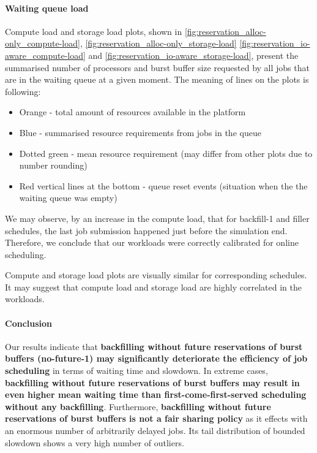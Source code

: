 \documentclass[thesis-en.tex]{subfiles}
\begin{document}
\paragraph{Waiting queue load}
Compute load and storage load plots, shown in \autoref{fig:reservation_alloc-only_compute-load}, \autoref{fig:reservation_alloc-only_storage-load} \autoref{fig:reservation_io-aware_compute-load} and \autoref{fig:reservation_io-aware_storage-load}, present the summarised number of processors and burst buffer size requested by all jobs that are in the waiting queue at a given moment. The meaning of lines on the plots is following:
\begin{itemize}
    \item Orange - total amount of resources available in the platform
    \item Blue - summarised resource requirements from jobs in the queue
    \item Dotted green - mean resource requirement (may differ from other plots due to number rounding)
    \item Red vertical lines at the bottom - queue reset events (situation when the the waiting queue was empty)
\end{itemize}

We may observe, by an increase in the compute load, that for backfill-1 and filler schedules, the last job submission happened just before the simulation end. Therefore, we conclude that our workloads were correctly calibrated for online scheduling.

Compute and storage load plots are visually similar for corresponding schedules. It may suggest that compute load and storage load are highly correlated in the workloads.

\paragraph{Conclusion}
Our results indicate that \textbf{backfilling without future reservations of burst buffers (no-future-1) may significantly deteriorate the efficiency of job scheduling} in terms of waiting time and slowdown. In extreme cases, \textbf{backfilling without future reservations of burst buffers may result in even higher mean waiting time than first-come-first-served scheduling without any backfilling}. Furthermore, \textbf{backfilling without future reservations of burst buffers is not a fair sharing policy} as it effects with an enormous number of arbitrarily delayed jobs. Its tail distribution of bounded slowdown shows a very high number of outliers.
\end{document}
